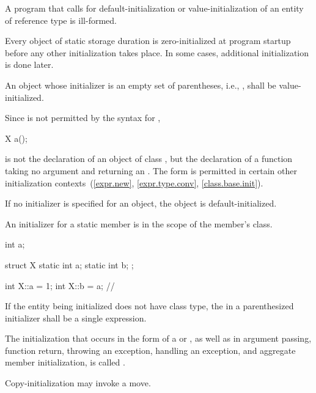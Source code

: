 \pnum
A program that calls for default-initialization
or value-initialization
of an entity
of reference type is ill-formed.

\pnum
\begin{note} Every
object of static storage duration is
zero-initialized at program startup before any other initialization
takes place.
In some cases, additional initialization is done later.
\end{note}

\pnum
An object whose initializer is an empty set of parentheses, i.e.,
\tcode{()},
shall be
value-initialized.

%
\begin{note}
Since
\tcode{()}
is not permitted by the syntax for
,

\begin{codeblock}
X a();
\end{codeblock}

is not the declaration of an object of class
,
but the declaration of a function taking no argument and returning an
.
The form
\tcode{()}
is permitted in certain other initialization contexts~(\ref{expr.new},
\ref{expr.type.conv}, \ref{class.base.init}).
\end{note}

\pnum
If no initializer is specified for an object, the object is default-initialized.

\pnum
{}%
An initializer for a static member is in the scope of the member's class.
\begin{example}
\begin{codeblock}
int a;

struct X {
  static int a;
  static int b;
};

int X::a = 1;
int X::b = a;                   // 
\end{codeblock}
\end{example}

\pnum
If the entity being initialized does not have class type, the
 in a
parenthesized initializer shall be a single expression.

\pnum
{}%
%
The initialization that occurs in the \tcode{=} form of a
 or
,
as well as in argument passing, function return,
throwing an exception,
handling an exception,
and aggregate member initialization,
is called
.
\begin{note}
Copy-initialization may invoke a move.
\end{note}

